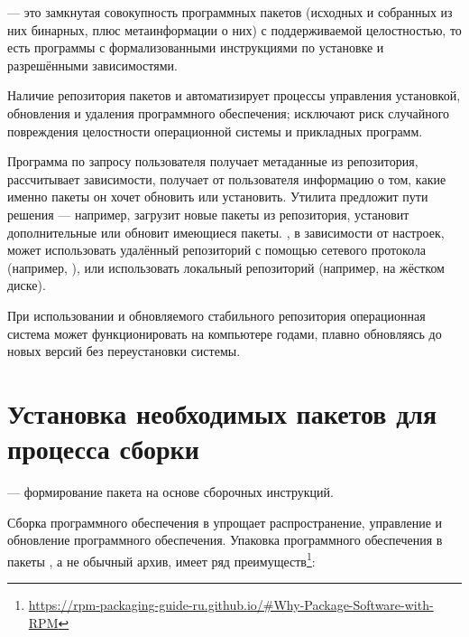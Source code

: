  --- это замкнутая совокупность программных пакетов (исходных и 
собранных из них бинарных, плюс метаинформации о них) с поддерживаемой целостностью, то есть программы с 
формализованными инструкциями по установке и разрешёнными зависимостями.

Наличие репозитория пакетов и  автоматизирует процессы управления установкой, обновления и удаления 
программного обеспечения; исключают риск случайного повреждения целостности операционной системы и прикладных 
программ.

Программа  по запросу пользователя получает метаданные из репозитория, рассчитывает зависимости, 
получает от пользователя информацию о том, какие именно пакеты он хочет обновить или установить. Утилита 
предложит пути решения --- например, загрузит новые пакеты из репозитория, установит дополнительные или 
обновит имеющиеся пакеты. , в зависимости от настроек, может использовать удалённый репозиторий 
с помощью сетевого протокола (например, ), или использовать локальный репозиторий (например, 
на жёстком диске).


При использовании  и обновляемого стабильного репозитория операционная система может 
функционировать на компьютере годами, плавно обновляясь до новых версий без переустановки системы. 

\section{Установка необходимых пакетов для процесса сборки}
 --- формирование пакета на основе сборочных инструкций.

Сборка программного обеспечения в  упрощает распространение, управление и обновление программного 
обеспечения. Упаковка программного обеспечения в пакеты , а не обычный архив, имеет ряд 
преимуществ\footnote{\href{https://rpm-packaging-guide-ru.github.io/\#Why-Package-Software-with-RPM}
{https://rpm-packaging-guide-ru.github.io/\#Why-Package-Software-with-RPM}}:

